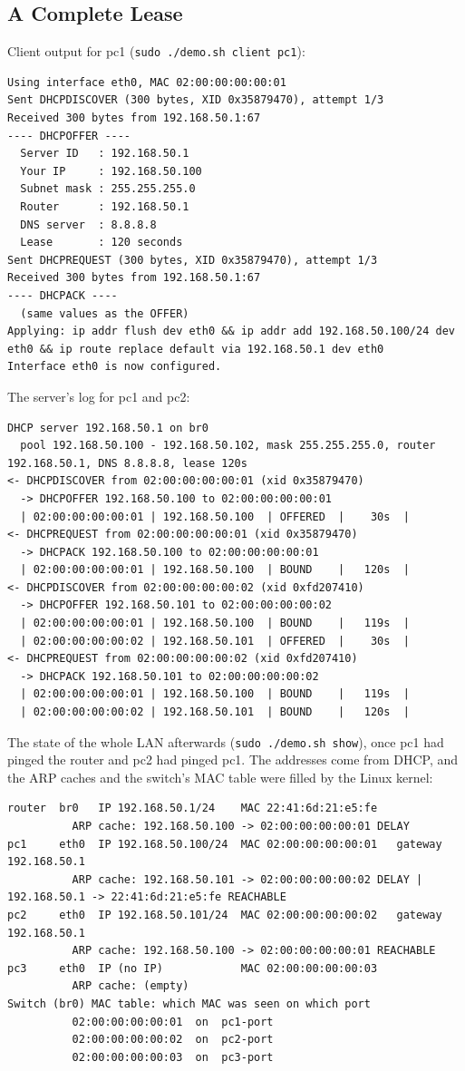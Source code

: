 \documentclass[11pt]{article}
\begin{document}
\subsection{A Complete Lease}
Client output for pc1 (\texttt{sudo ./demo.sh client pc1}):
\begin{lstlisting}[style=log]
Using interface eth0, MAC 02:00:00:00:00:01
Sent DHCPDISCOVER (300 bytes, XID 0x35879470), attempt 1/3
Received 300 bytes from 192.168.50.1:67
---- DHCPOFFER ----
  Server ID   : 192.168.50.1
  Your IP     : 192.168.50.100
  Subnet mask : 255.255.255.0
  Router      : 192.168.50.1
  DNS server  : 8.8.8.8
  Lease       : 120 seconds
Sent DHCPREQUEST (300 bytes, XID 0x35879470), attempt 1/3
Received 300 bytes from 192.168.50.1:67
---- DHCPACK ----
  (same values as the OFFER)
Applying: ip addr flush dev eth0 && ip addr add 192.168.50.100/24 dev eth0 && ip route replace default via 192.168.50.1 dev eth0
Interface eth0 is now configured.
\end{lstlisting}
The server's log for pc1 and pc2:
\begin{lstlisting}[style=log]
DHCP server 192.168.50.1 on br0
  pool 192.168.50.100 - 192.168.50.102, mask 255.255.255.0, router 192.168.50.1, DNS 8.8.8.8, lease 120s
<- DHCPDISCOVER from 02:00:00:00:00:01 (xid 0x35879470)
  -> DHCPOFFER 192.168.50.100 to 02:00:00:00:00:01
  | 02:00:00:00:00:01 | 192.168.50.100  | OFFERED  |    30s  |
<- DHCPREQUEST from 02:00:00:00:00:01 (xid 0x35879470)
  -> DHCPACK 192.168.50.100 to 02:00:00:00:00:01
  | 02:00:00:00:00:01 | 192.168.50.100  | BOUND    |   120s  |
<- DHCPDISCOVER from 02:00:00:00:00:02 (xid 0xfd207410)
  -> DHCPOFFER 192.168.50.101 to 02:00:00:00:00:02
  | 02:00:00:00:00:01 | 192.168.50.100  | BOUND    |   119s  |
  | 02:00:00:00:00:02 | 192.168.50.101  | OFFERED  |    30s  |
<- DHCPREQUEST from 02:00:00:00:00:02 (xid 0xfd207410)
  -> DHCPACK 192.168.50.101 to 02:00:00:00:00:02
  | 02:00:00:00:00:01 | 192.168.50.100  | BOUND    |   119s  |
  | 02:00:00:00:00:02 | 192.168.50.101  | BOUND    |   120s  |
\end{lstlisting}
The state of the whole LAN afterwards (\texttt{sudo ./demo.sh show}), once pc1 had pinged
the router and pc2 had pinged pc1. The addresses come from DHCP, and the ARP caches and
the switch's MAC table were filled by the Linux kernel:
\begin{lstlisting}[style=log]
router  br0   IP 192.168.50.1/24    MAC 22:41:6d:21:e5:fe
          ARP cache: 192.168.50.100 -> 02:00:00:00:00:01 DELAY
pc1     eth0  IP 192.168.50.100/24  MAC 02:00:00:00:00:01   gateway 192.168.50.1
          ARP cache: 192.168.50.101 -> 02:00:00:00:00:02 DELAY | 192.168.50.1 -> 22:41:6d:21:e5:fe REACHABLE
pc2     eth0  IP 192.168.50.101/24  MAC 02:00:00:00:00:02   gateway 192.168.50.1
          ARP cache: 192.168.50.100 -> 02:00:00:00:00:01 REACHABLE
pc3     eth0  IP (no IP)            MAC 02:00:00:00:00:03
          ARP cache: (empty)
Switch (br0) MAC table: which MAC was seen on which port
          02:00:00:00:00:01  on  pc1-port
          02:00:00:00:00:02  on  pc2-port
          02:00:00:00:00:03  on  pc3-port
\end{lstlisting}
\end{document}
